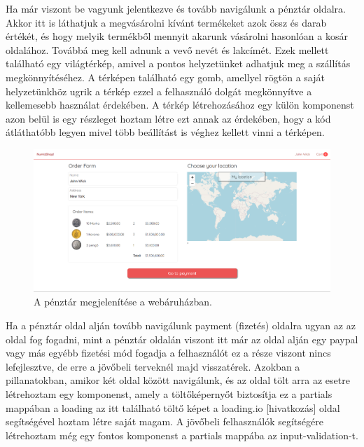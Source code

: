 Ha már viszont be vagyunk jelentkezve és tovább navigálunk a pénztár oldalra. Akkor itt is láthatjuk a megvásárolni kívánt termékeket azok össz és darab értékét, és hogy melyik termékből mennyit akarunk vásárolni hasonlóan a kosár oldalához. Továbbá meg kell adnunk a vevő nevét és lakcímét. Ezek mellett található egy világtérkép, amivel a pontos helyzetünket adhatjuk meg a szállítás megkönnyítéséhez. A térképen található egy gomb, amellyel rögtön a saját helyzetünkhöz ugrik a térkép ezzel a felhasználó dolgát megkönnyítve a kellemesebb használat érdekében. A térkép létrehozásához egy külön komponenst azon belül is egy részleget hoztam létre ezt annak az érdekében, hogy a kód átláthatóbb legyen mivel több beállítást is véghez kellett vinni a térképen.

\begin{figure}[h]
\centering
\includegraphics[scale=0.3]{images/checkout.png}
\caption{A pénztár megjelenítése a webáruházban.}
\label{fig:penztar}
\end{figure}

Ha a pénztár oldal alján tovább navigálunk payment (fizetés) oldalra ugyan az az oldal fog fogadni, mint a pénztár oldalán viszont itt már az oldal alján egy paypal vagy más egyébb fizetési mód fogadja a felhasználót ez a része viszont nincs lefejlesztve, de erre a jövőbeli terveknél majd visszatérek. Azokban a pillanatokban, amikor két oldal között navigálunk, és az oldal tölt arra az esetre létrehoztam egy komponenst, amely a töltőképernyőt biztosítja ez a partials mappában a loading az itt található töltő képet a loading.io [hivatkozás] oldal segítségével hoztam létre saját magam. A jövőbeli felhasználók segítségére létrehoztam még egy fontos komponenst a partials mappába az input-validation-t.

